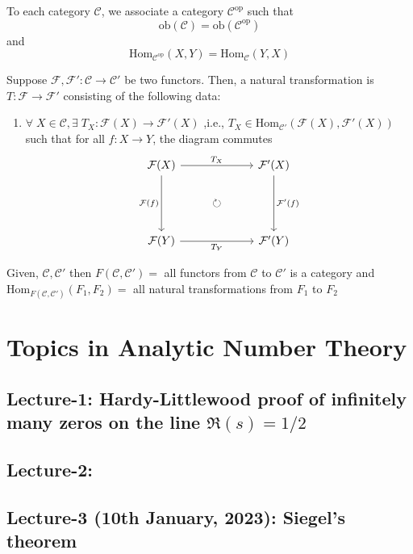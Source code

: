 \documentclass[oneside, 12pt, ]{scrbook}
\theoremstyle{theorem}
\begin{document}
To each category $\mathcal{C}$, we associate a category $\mathcal{C}^{\mathrm{op}}$ such that $$\mathrm{ob}(\mathcal{C}) = \mathrm{ob}(\mathcal{C}^{\mathrm{op}})$$ and $$\mathrm{Hom}_{\mathcal{C}^{\mathrm{op}}}(X,Y) = \mathrm{Hom}_{\mathcal{C}}(Y,X)$$

Suppose $\mathcal{F},\mathcal{F}' : \mathcal{C} \rightarrow \mathcal{C}'$ be two functors. Then, a natural transformation is $T: \mathcal{F} \rightarrow \mathcal{F}'$ consisting of the following data: 
\begin{enumerate}
\item $\forall \; X \in \mathcal{C} , \exists \; T_{X} : \mathcal{F}(X) \rightarrow \mathcal{F}'(X)$ ,i.e., $T_{X} \in \mathrm{Hom}_{\mathcal{C}'}(\mathcal{F}(X),\mathcal{F}' (X))$ such that for all $f: X \rightarrow Y$, the diagram commutes\[\begin{tikzcd}
	{\mathcal{F}(X)} & {} & {\mathcal{F}'(X)} \\
	{} & \circlearrowright & {} \\
	{\mathcal{F}(Y)} && {\mathcal{F}'(Y)}
	\arrow["{T_{X}}", from=1-1, to=1-3]
	\arrow["{\mathcal{F}(f)}"', from=1-1, to=3-1]
	\arrow["{\mathcal{F}'(f)}", from=1-3, to=3-3]
	\arrow["{T_{Y}}"', from=3-1, to=3-3]
\end{tikzcd}\]
\end{enumerate}

Given, $\mathcal{C}, \mathcal{C}'$ then $F(\mathcal{C}, \mathcal{C}')=$ all functors from $\mathcal{C}$ to $\mathcal{C}'$ is a category and $\mathrm{Hom}_{F(\mathcal{C}, \mathcal{C}')}(F_{1},F_{2})=$ all natural transformations from $F_{1}$ to $F_{2}$ 






\part{Topics in Analytic Number Theory}

\chapter{Lecture-1: Hardy-Littlewood proof of infinitely many zeros on the line $\mathfrak{R}(s) = 1/2$}

\chapter{Lecture-2: }

\chapter{Lecture-3 (10th January, 2023): Siegel's theorem }
\end{document}
